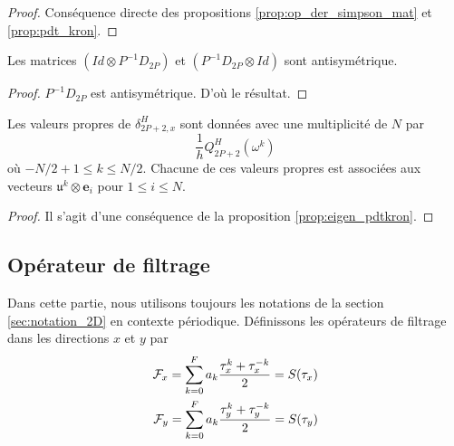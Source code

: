 \begin{proof}
Conséquence directe des propositions \ref{prop:op_der_simpson_mat} et \ref{prop:pdt_kron}.
\end{proof}

\begin{proposition}
Les matrices $(Id \otimes P^{-1}D_{2P})$ et $(P^{-1}D_{2P} \otimes Id)$ sont antisymétrique.
\end{proposition}

\begin{proof}
$P^{-1}D_{2P}$ est antisymétrique. D'où le résultat.
\end{proof}

\begin{proposition}
Les valeurs propres de $\delta_{2P+2,x}^H$ sont données avec une multiplicité de $N$ par
\begin{equation}
\dfrac{1}{h}Q_{2P+2}^H(\omega^k)
\end{equation}
où $-N/2+1 \leq k \leq N/2$. Chacune de ces valeurs propres est associées aux vecteurs $\mathfrak{u}^k \otimes \mathbf{e}_i$ pour $1 \leq i \leq N$.
\end{proposition}

\begin{proof}
Il s'agit d'une conséquence de la proposition \ref{prop:eigen_pdtkron}.
\end{proof}








\subsection{Opérateur de filtrage}

Dans cette partie, nous utilisons toujours les notations de la section \ref{sec:notation_2D} en contexte périodique. Définissons les opérateurs de filtrage dans les directions $x$ et $y$ par
\begin{eqnarray*}
\mathcal{F}_x = \displaystyle\sum\limits_{k=0}^F a_k \dfrac{\tau_x^k + \tau_x^{-k}}{2}  = S(\tau_x)\\
\mathcal{F}_y = \displaystyle\sum\limits_{k=0}^F a_k \dfrac{\tau_y^k + \tau_y^{-k}}{2} = S(\tau_y) \\
\end{eqnarray*}

